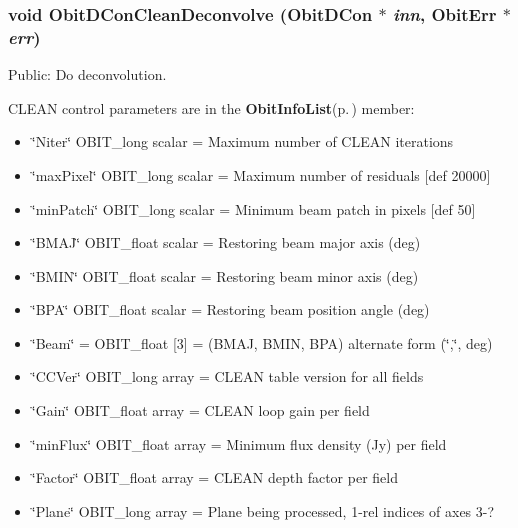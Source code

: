\subsubsection{\setlength{\rightskip}{0pt plus 5cm}void Obit\-DCon\-Clean\-Deconvolve ({\bf Obit\-DCon} $\ast$ {\em inn}, {\bf Obit\-Err} $\ast$ {\em err})}\label{ObitDConClean_8c_a17}


Public: Do deconvolution. 

CLEAN control parameters are in the {\bf Obit\-Info\-List}{\rm (p.\,\pageref{structObitInfoList})} member: \begin{itemize}
\item \char`\"{}Niter\char`\"{} OBIT\_\-long scalar = Maximum number of CLEAN iterations \item \char`\"{}max\-Pixel\char`\"{} OBIT\_\-long scalar = Maximum number of residuals [def 20000] \item \char`\"{}min\-Patch\char`\"{} OBIT\_\-long scalar = Minimum beam patch in pixels [def 50] \item \char`\"{}BMAJ\char`\"{} OBIT\_\-float scalar = Restoring beam major axis (deg) \item \char`\"{}BMIN\char`\"{} OBIT\_\-float scalar = Restoring beam minor axis (deg) \item \char`\"{}BPA\char`\"{} OBIT\_\-float scalar = Restoring beam position angle (deg) \item \char`\"{}Beam\char`\"{} = OBIT\_\-float [3] = (BMAJ, BMIN, BPA) alternate form (\char`\"{},\char`\"{}, deg) \item \char`\"{}CCVer\char`\"{} OBIT\_\-long array = CLEAN table version for all fields \item \char`\"{}Gain\char`\"{} OBIT\_\-float array = CLEAN loop gain per field \item \char`\"{}min\-Flux\char`\"{} OBIT\_\-float array = Minimum flux density (Jy) per field \item \char`\"{}Factor\char`\"{} OBIT\_\-float array = CLEAN depth factor per field \item \char`\"{}Plane\char`\"{} OBIT\_\-long array = Plane being processed, 1-rel indices of axes 3-? 
\end{itemize}
